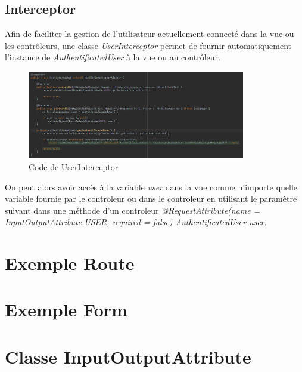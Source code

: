 		\subsection{Interceptor}

			Afin de faciliter la gestion de l'utilisateur actuellement connecté dans la vue ou les contrôleurs, une classe \textit{UserInterceptor} permet de fournir automatiquement l'instance de \textit{AuthentificatedUser} à la vue ou au contrôleur.

			\begin{figure}[H]
				\centering\includegraphics[width=0.85\textwidth, keepaspectratio]{res/UserInterceptor.png}
				\caption{Code de UserInterceptor}
			\end{figure}

			On peut alors avoir accès à la variable \textit{user} dans la vue comme n'importe quelle variable fournie par le controleur ou dans le controleur en utilisant le paramètre suivant dans une méthode d'un controleur \textit{@RequestAttribute(name = InputOutputAttribute.USER, required = false) AuthentificatedUser user}.

	\section{Exemple Route}


	\section{Exemple Form}


	\section{Classe InputOutputAttribute}

